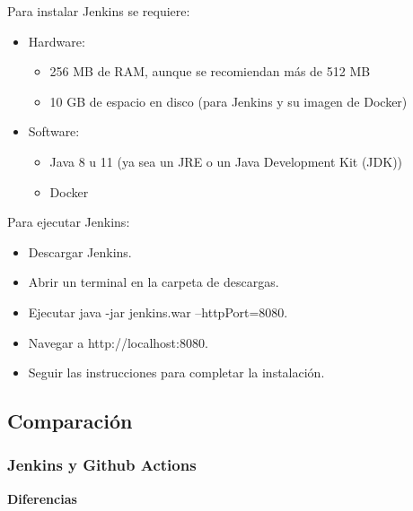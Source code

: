 \documentclass[twoside,twocolumn]{article}
\begin{document}
Para instalar Jenkins se requiere:

\begin{itemize}
    \item Hardware:
    \begin{itemize}
        \item 256 MB de RAM, aunque se recomiendan más de 512 MB
        \item 10 GB de espacio en disco (para Jenkins y su imagen de Docker)
    \end{itemize}
    \item Software:
    \begin{itemize}
        \item Java 8 u 11 (ya sea un JRE o un Java Development Kit (JDK))
        \item Docker
    \end{itemize}
\end{itemize}

Para ejecutar Jenkins:

\begin{itemize}
    \item Descargar Jenkins.
    \item Abrir un terminal en la carpeta de descargas.
    \item Ejecutar java -jar jenkins.war --httpPort=8080.
    \item Navegar a http://localhost:8080.
    \item Seguir las instrucciones para completar la instalación.
\end{itemize}

\subsection{Comparación}

\subsubsection{Jenkins y Github Actions}

\textbf{Diferencias}
\end{document}
